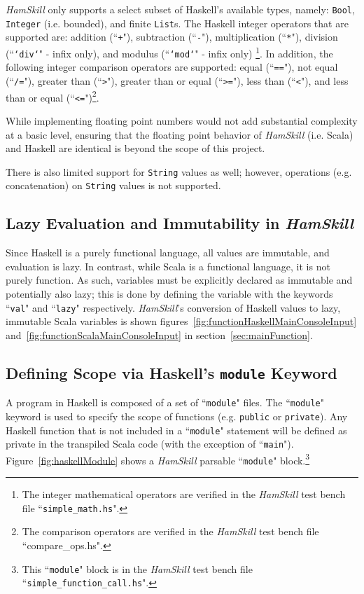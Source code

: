 \documentclass{report}
\begin{document}
\emph{HamSkill} only supports a select subset of Haskell's available types, namely: \texttt{Bool}, \texttt{\tt Integer} (i.e. bounded), and finite \texttt{List}s.  The Haskell integer operators that are supported are: addition (``\texttt{+}"), subtraction (``\texttt{-}"), multiplication (``\texttt{*}"), division (``\texttt{`div`}" - infix only), and modulus (``\texttt{`mod`}" - infix only) \footnote{The integer mathematical operators are verified in the \textit{HamSkill} test bench file ``\texttt{simple\_math.hs}".}.  In addition, the following integer comparison operators are supported: equal (``\texttt{==}"), not equal (``\texttt{/=}"), greater than (``\texttt{>}"), greater than or equal (``\texttt{>=}"), less than (``\texttt{<}"), and less than or equal (``\texttt{<=}")\footnote{The comparison operators are verified in the \textit{HamSkill} test bench file ``compare\_ops.hs".}.

While implementing floating point numbers would not add substantial complexity at a basic level, ensuring that the floating point behavior of \emph{HamSkill} (i.e. Scala) and Haskell are identical is beyond the scope of this project.

There is also limited support for \texttt{String} values as well; however, operations (e.g. concatenation) on \texttt{String} values is not supported.

\subsection{Lazy Evaluation and Immutability in \textit{HamSkill}}\label{sec:immutabilityScala}

Since Haskell is a purely functional language, all values are immutable, and evaluation is lazy.  In contrast, while Scala is a functional language, it is not purely function.  As such, variables must be explicitly declared as immutable and potentially also lazy; this is done by defining the variable with the keywords ``\texttt{val}" and ``\texttt{lazy}" respectively.  \textit{HamSkill}'s conversion of Haskell values to lazy, immutable Scala variables is shown figures~\ref{fig:functionHaskellMainConsoleInput} and~\ref{fig:functionScalaMainConsoleInput} in section~\ref{sec:mainFunction}.


\subsection{Defining Scope via Haskell's {\tt module} Keyword}

A program in Haskell is composed of a set of ``{\tt module}" files.  The ``{\tt module}" keyword is used to specify the scope of functions (e.g. {\tt public} or {\tt private}). Any Haskell function that is not included in a ``\texttt{module}" statement will be defined as private in the transpiled Scala code (with the exception of ``\texttt{main}").  Figure~\ref{fig:haskellModule} shows a \textit{HamSkill} parsable ``\texttt{module}" block.\footnote{This ``\texttt{module}" block is in the \textit{HamSkill} test bench file ``\texttt{simple\_function\_call.hs}".}
\end{document}
